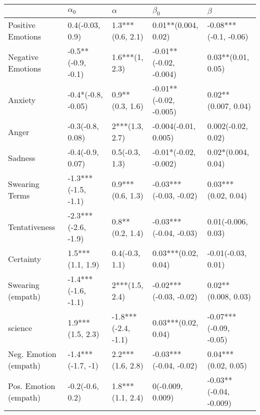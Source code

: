 \begin{tabular}{lllll}
\toprule
{} &           $\alpha_0$ &             $\alpha$ &               $\beta_0$ &                 $\beta$ \\
\midrule
Positive Emotions     &      0.4(-0.03, 0.9) &     1.3***(0.6, 2.1) &     0.01**(0.004, 0.02) &   -0.08***(-0.1, -0.06) \\
Negative Emotions     &   -0.5**(-0.9, -0.1) &       1.6***(1, 2.3) &  -0.01**(-0.02, -0.004) &      0.03**(0.01, 0.05) \\
Anxiety               &   -0.4*(-0.8, -0.05) &      0.9**(0.3, 1.6) &  -0.01**(-0.02, -0.005) &     0.02**(0.007, 0.04) \\
Anger                 &     -0.3(-0.8, 0.08) &       2***(1.3, 2.7) &    -0.004(-0.01, 0.005) &      0.002(-0.02, 0.02) \\
Sadness               &     -0.4(-0.9, 0.07) &       0.5(-0.3, 1.3) &   -0.01*(-0.02, -0.002) &      0.02*(0.004, 0.04) \\
Swearing Terms        &  -1.3***(-1.5, -1.1) &     0.9***(0.6, 1.3) &  -0.03***(-0.03, -0.02) &     0.03***(0.02, 0.04) \\
Tentativeness         &  -2.3***(-2.6, -1.9) &      0.8**(0.2, 1.4) &  -0.03***(-0.04, -0.03) &      0.01(-0.006, 0.03) \\
Certainty             &     1.5***(1.1, 1.9) &       0.4(-0.3, 1.1) &     0.03***(0.02, 0.04) &      -0.01(-0.03, 0.01) \\
Swearing (empath)     &  -1.4***(-1.6, -1.1) &       2***(1.5, 2.4) &  -0.02***(-0.03, -0.02) &     0.02**(0.008, 0.03) \\
science               &     1.9***(1.5, 2.3) &  -1.8***(-2.4, -1.1) &     0.03***(0.02, 0.04) &  -0.07***(-0.09, -0.05) \\
Neg. Emotion (empath) &    -1.4***(-1.7, -1) &     2.2***(1.6, 2.8) &  -0.03***(-0.04, -0.02) &     0.04***(0.02, 0.05) \\
Pos. Emotion (empath) &      -0.2(-0.6, 0.2) &     1.8***(1.1, 2.4) &        0(-0.009, 0.009) &  -0.03**(-0.04, -0.009) \\
\bottomrule
\end{tabular}

